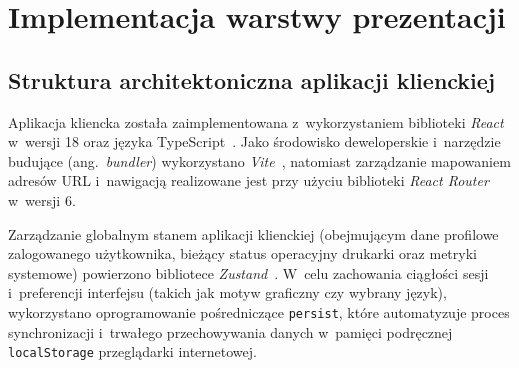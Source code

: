 \documentclass[a4paper,12pt,reqno]{article}
\begin{document}
\newpage

\section{Implementacja warstwy prezentacji}
\label{sec:frontend}

\subsection{Struktura architektoniczna aplikacji klienckiej}

Aplikacja kliencka została zaimplementowana z~wykorzystaniem biblioteki \textit{React}~\cite{react} w~wersji 18 oraz języka TypeScript~\cite{typescript}. Jako środowisko deweloperskie i~narzędzie budujące (ang.~\textit{bundler}) wykorzystano \textit{Vite}~\cite{vite}, natomiast zarządzanie mapowaniem adresów URL i~nawigacją realizowane jest przy użyciu biblioteki \textit{React Router}~\cite{router} w~wersji 6.

Zarządzanie globalnym stanem aplikacji klienckiej (obejmującym dane profilowe zalogowanego użytkownika, bieżący status operacyjny drukarki oraz metryki systemowe) powierzono bibliotece \textit{Zustand}~\cite{zustand}. W~celu zachowania ciągłości sesji i~preferencji interfejsu (takich jak motyw graficzny czy wybrany język), wykorzystano oprogramowanie pośredniczące \texttt{persist}, które automatyzuje proces synchronizacji i~trwałego przechowywania danych w~pamięci podręcznej \texttt{localStorage} przeglądarki internetowej.
\end{document}
